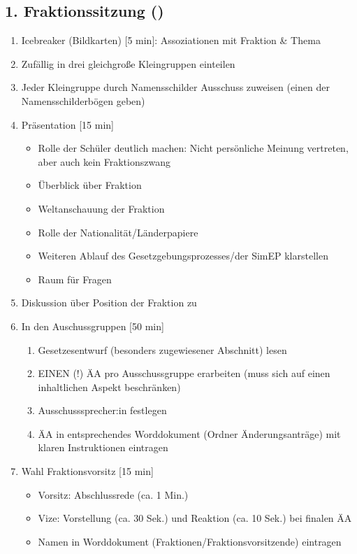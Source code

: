 \documentclass{article}
\begin{document}
	\subsection{1. Fraktionssitzung (\timeFrakOne)}
	\begin{enumerate}
		\item Icebreaker (Bildkarten) [5 min]: \newline Assoziationen mit Fraktion \& Thema
        \item Zufällig in drei gleichgroße Kleingruppen einteilen
        \item Jeder Kleingruppe durch Namensschilder Ausschuss zuweisen (einen der Namensschilderbögen geben)
		\item Präsentation [15 min]
		\begin{itemize}
			\item Rolle der Schüler deutlich machen: \newline
            Nicht persönliche Meinung vertreten, aber auch kein Fraktionszwang
			\item Überblick über Fraktion
			\item Weltanschauung der Fraktion
			\item Rolle der Nationalität/Länderpapiere
			\item Weiteren Ablauf des Gesetzgebungsprozesses/der SimEP klarstellen
            \item Raum für Fragen
		\end{itemize}
		\item Diskussion über Position der Fraktion zu \THEMA \newline [10 min]
		\item In den Auschussgruppen [50 min]
		\begin{enumerate}
			\item Gesetzesentwurf (besonders zugewiesener Abschnitt) lesen
			\item EINEN (!) ÄA pro Ausschussgruppe erarbeiten \newline (muss sich auf einen inhaltlichen Aspekt beschränken)
	        \item Ausschusssprecher:in festlegen		
            \item ÄA in entsprechendes Worddokument (Ordner Änderungsanträge) mit klaren Instruktionen eintragen
		\end{enumerate} 
		\item Wahl Fraktionsvorsitz [15 min]
		\begin{itemize}
			\item Vorsitz: Abschlussrede (ca. 1 Min.)
			\item Vize: Vorstellung (ca. 30 Sek.) und Reaktion (ca. 10 Sek.) \newline bei finalen ÄA 
			\item Namen in Worddokument (Fraktionen/Fraktionsvorsitzende) \newline eintragen
		\end{itemize}
	\end{enumerate}
	
\end{document}
